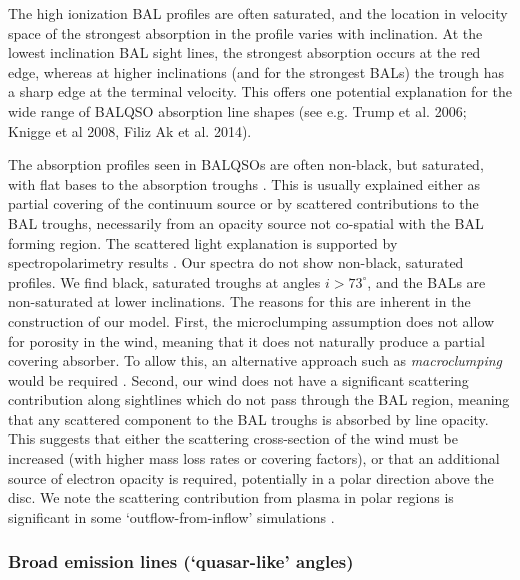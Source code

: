 \documentclass[useAMS,usenatbib]{mn2e_x}
\begin{document}
The high ionization BAL profiles are often saturated, and the location in velocity space
of the strongest absorption in the profile varies with inclination.
At the lowest inclination BAL sight lines, the strongest absorption occurs at the red edge,
whereas at higher inclinations (and for the strongest BALs)
the trough has a sharp edge at the terminal velocity.
This offers one potential explanation for the wide range of BALQSO absorption
line shapes (see e.g. Trump et al. 2006; Knigge et al 2008, Filiz Ak et al. 2014).

The absorption profiles seen in BALQSOs are often non-black, but saturated, 
with flat bases to the absorption troughs \citep{arav1999b,arav1999a}.
This is usually explained either as  partial covering of the continuum
source or by scattered contributions to the BAL troughs, necessarily
from an opacity source not co-spatial with the BAL forming region.
The scattered light explanation is supported by spectropolarimetry results
\citep{lamy2000}. Our spectra do not show non-black, saturated profiles.
We find black, saturated troughs at angles $i > 73^\circ$, and the BALs
are non-saturated at lower inclinations. The reasons for this are inherent 
in the construction of our model. 
First, the microclumping assumption does not allow for 
porosity in the wind, meaning that it does not naturally produce
a partial covering absorber. To allow this, an alternative approach
such as {\em macroclumping} would be required \citep[e.g.][]{hamann2008,surlan2012}.
Second, our wind does not have a significant scattering contribution 
along sightlines which do not pass through the BAL region,
meaning that any scattered component to the BAL troughs is absorbed by line opacity.
This suggests that either the scattering cross-section of the wind must
be increased (with higher mass loss rates or covering factors), or 
that an additional source of electron opacity is required, potentially
in a polar direction above the disc. We note the scattering contribution
from plasma in polar regions is significant in some `outflow-from-inflow'
simulations \citep{KP09, simproga2012}.

\subsubsection{Broad emission lines (`quasar-like' angles)}
\end{document}
